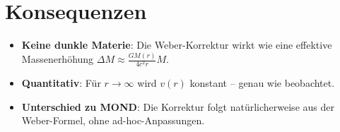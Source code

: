 \section*{Konsequenzen}
\begin{itemize}
\item \textbf{Keine dunkle Materie}: Die Weber-Korrektur wirkt wie eine effektive Massenerhöhung \(\Delta M \approx \frac{GM(r)}{4c^2r}M\).
\item \textbf{Quantitativ}: Für \(r \to \infty\) wird \(v(r)\) konstant – genau wie beobachtet.
\item \textbf{Unterschied zu MOND}: Die Korrektur folgt natürlicherweise aus der Weber-Formel, ohne ad-hoc-Anpassungen.
\end{itemize}
